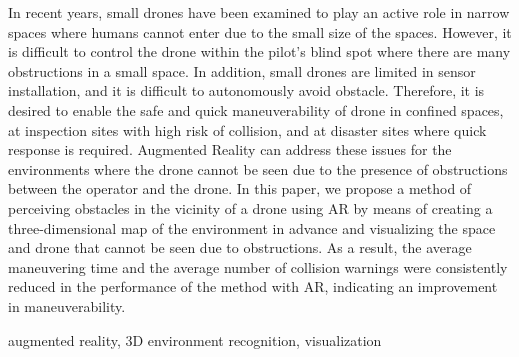 \documentclass[submit, sigrecommended]{ipsj}
\begin{document}
\begin{eabstract}
In recent years, small drones have been examined to play an active role in narrow spaces where humans cannot enter due to the small size of the spaces. 
However, it is difficult to control the drone within the pilot’s blind spot where there are many obstructions in a small space. 
In addition, small drones are limited in sensor installation, and it is difficult to autonomously avoid obstacle. 
Therefore, it is desired to enable the safe and quick maneuverability of drone in confined spaces, at inspection sites with high risk of collision, and at disaster sites where quick response is required.
Augmented Reality can address these issues for the environments where the drone cannot be seen due to the presence of obstructions between the operator and the drone. 
In this paper, we propose a method of perceiving obstacles in the vicinity of a drone using AR by means of creating a three-dimensional map of the environment in advance and visualizing the space and drone that cannot be seen due to obstructions. As a result, the average maneuvering time and the average number of collision warnings were consistently reduced in the performance of the method with AR, indicating an improvement in maneuverability.
\end{eabstract}

\begin{ekeyword}
augmented reality, 3D environment recognition, visualization
\end{ekeyword}

\maketitle

\end{document}
